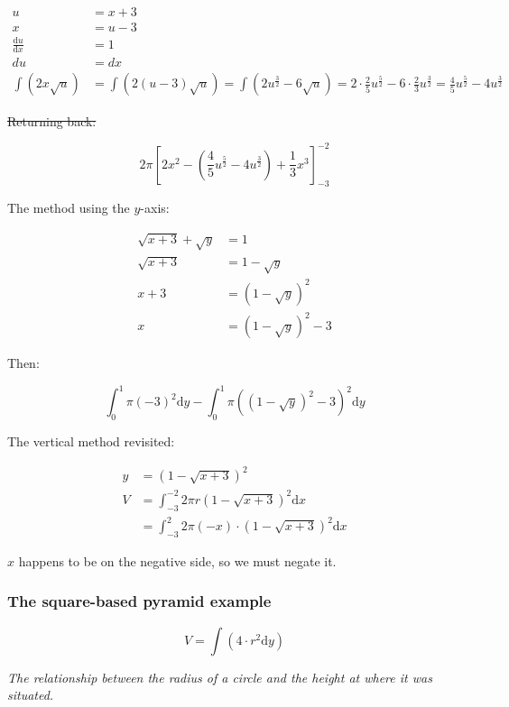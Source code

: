 \documentclass[12pt]{article}
\theoremstyle{plain}
\theoremstyle{remark}
\theoremstyle{definition}
\begin{document}
\begin{align*}
u &= x + 3 \\
x &= u - 3 \\
\frac{\text{d}u}{\text{d}x} &= 1 \\
du &= dx \\
\int\left( 2x\sqrt{u} \right) &= \int\left( 2(u - 3)\sqrt{u} \right) = \int\left( 2u^{\frac{3}{2}} - 6\sqrt{u} \right) = 2 \cdot \frac{2}{5}u^{\frac{5}{2}} - 6 \cdot \frac{2}{3}u^{\frac{3}{2}} = \frac{4}{5}u^{\frac{5}{2}} - 4u^{\frac{3}{2}}
\end{align*}


\sout{Returning back:}

\[2\pi\left\lbrack 2x^{2} - \left( \frac{4}{5}u^{\frac{5}{2}} - 4u^{\frac{3}{2}} \right) + \frac{1}{3}x^{3} \right\rbrack_{- 3}^{- 2}\]

The method using the \(y\)-axis:

\begin{align*}
\sqrt{x + 3} + \sqrt{y} &= 1 \\
\sqrt{x + 3} &= 1 - \sqrt{y} \\
x + 3 &= \left( 1 - \sqrt{y} \right)^{2} \\
x &= \left( 1 - \sqrt{y} \right)^{2} - 3
\end{align*}


Then:

\[\int_{0}^{1}{\pi( - 3)^{2}\text{d}y} - \int_{0}^{1}{\pi\left( \left( 1 - \sqrt{y} \right)^{2} - 3 \right)^{2}\text{d}y}\]

The vertical method revisited:

\begin{align*}
y &= \left( 1 - \sqrt{x + 3} \right)^{2} \\
V &= \int_{- 3}^{- 2}{2\pi r\left( 1 - \sqrt{x + 3} \right)^{2}\text{d}x} \\
&= \int_{- 3}^{2}{2\pi( - x) \cdot \left( 1 - \sqrt{x + 3} \right)^{2}\text{d}x}
\end{align*}


\(x\) happens to be on the negative side, so we must negate it.


\subsubsection{The square-based pyramid
example}

\[V = \int\left( 4 \cdot r^{2}\text{d}y \right)\]

\emph{The relationship between the radius of a circle and the height at
where it was situated.}
\end{document}
